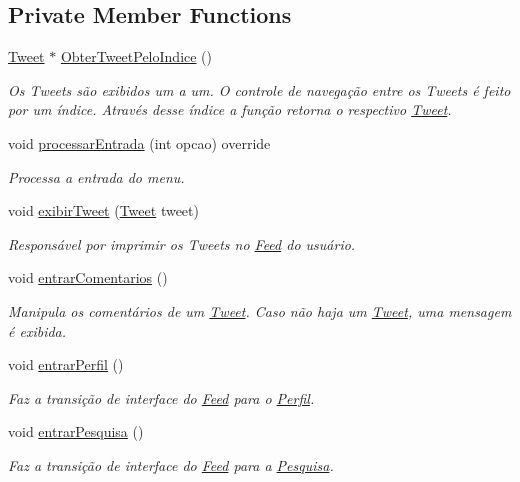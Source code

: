 \subsection*{Private Member Functions}
\begin{DoxyCompactItemize}
\item 
\hyperlink{class_tweet}{Tweet} $\ast$ \hyperlink{class_feed_a75babf2ee06b455ffee4236a41621500}{Obter\+Tweet\+Pelo\+Indice} ()
\begin{DoxyCompactList}\small\item\em Os Tweets são exibidos um a um. O controle de navegação entre os Tweets é feito por um índice. Através desse índice a função retorna o respectivo \hyperlink{class_tweet}{Tweet}. \end{DoxyCompactList}\item 
void \hyperlink{class_feed_ac10ffff3edd9e5e9b51fd713bc055dff}{processar\+Entrada} (int opcao) override
\begin{DoxyCompactList}\small\item\em Processa a entrada do menu. \end{DoxyCompactList}\item 
void \hyperlink{class_feed_adafda05a2ddb99e160261e9728d84da0}{exibir\+Tweet} (\hyperlink{class_tweet}{Tweet} tweet)
\begin{DoxyCompactList}\small\item\em Responsável por imprimir os Tweets no \hyperlink{class_feed}{Feed} do usuário. \end{DoxyCompactList}\item 
void \hyperlink{class_feed_a22a0e61766790e181a93ad5f79a53e18}{entrar\+Comentarios} ()
\begin{DoxyCompactList}\small\item\em Manipula os comentários de um \hyperlink{class_tweet}{Tweet}. Caso não haja um \hyperlink{class_tweet}{Tweet}, uma mensagem é exibida. \end{DoxyCompactList}\item 
void \hyperlink{class_feed_a2f56b3ff3188da4c500f9943c8b8c6da}{entrar\+Perfil} ()
\begin{DoxyCompactList}\small\item\em Faz a transição de interface do \hyperlink{class_feed}{Feed} para o \hyperlink{class_perfil}{Perfil}. \end{DoxyCompactList}\item 
void \hyperlink{class_feed_a9b96760a159b09654b5d5ca04c306e03}{entrar\+Pesquisa} ()
\begin{DoxyCompactList}\small\item\em Faz a transição de interface do \hyperlink{class_feed}{Feed} para a \hyperlink{class_pesquisa}{Pesquisa}. \end{DoxyCompactList}\item 

\end{DoxyCompactItemize}
